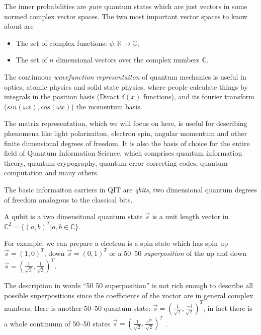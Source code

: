 \documentclass[aps,11pt,twoside,letterpaper]{article}
\def\c{\mathbb{C}}
\theoremstyle{plain}
\theoremstyle{definition}
\begin{document}
        The inner probabilities are \emph{pure} quantum states 
        which are just vectors in some normed complex vector spaces.
        The two most important vector spaces to know about are  
        \begin{itemize}
            \item   The set of complex functions: $\psi \colon \mathbb{R} \to \mathbb{C} $,
            \item   The set of $n$ dimensional vectors over the complex numbers $\c$.
        \end{itemize}
        The continuous \emph{wavefunction representaiton} of quantum mechanics is useful in optics,
        atomic physics and solid state physics, where people calculate things by integrals in 
        the position basis (Diract $\delta(x)$ functions),
        and its fourier transform ($sin(\omega x),cos(\omega x)$) the momentum basis.

        The matrix representation, which we will focus on here,  is useful for describing 
        phenomena like light polarizaiton, electron spin, angular momentum and other 
        finite dimensional degrees of freedom.
        It is also the basis of choice for the entire field of Quantum Information Science,
        which comprises quantum information theory, quantum crypography, quantum error correcting codes, 
        quantum computation and many others.

        The basic informaiton carriers in QIT are \emph{qbits}, two dimensional quantum degrees
        of freedom analogous to the classical bits. 

        \begin{definition}[qubit]
            A qubit is a two dimensitonal quantum state $\vec{s}$ is a 
            unit length vector in $\c^2 = \{(a,b)^T| a,b \in \c\}$.
        \end{definition}

        For example, we can prepare a electron is a spin state which has spin up $\vec{s}=(1,0)^T$,
        down $\vec{s}=(0,1)^T$ or a 50--50 \emph{superposition} of the up and down $\vec{s} = (\frac{1}{\sqrt{2}}, \frac{1}{\sqrt{2}})^T$.

        The description in words ``50 50 superposition'' is not rich enough to describe all possible superpositions since
        the coefficients of the voctor are in general complex numbers. 
        Here is another 50--50 quantum state: $\vec{s} = (\frac{1}{\sqrt{2}}, \frac{-i}{\sqrt{2}})^T$, in fact there is a
        whole continuum of 50--50  states $\vec{s} = (\frac{1}{\sqrt{2}}, \frac{e^{i\theta}}{\sqrt{2}})^T$ .
\end{document}
